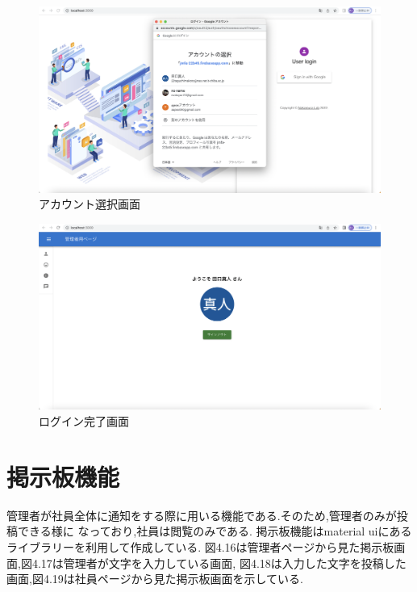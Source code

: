 \begin{figure}[!h]
  \begin{center}
    \includegraphics[scale=0.3, clip]{./img/sample14.png}
    \caption{アカウント選択画面}
    \label{fig:図の名前}
  \end{center}
  \end{figure}

  \begin{figure}[!h]
    \begin{center}
      \includegraphics[scale=0.3, clip]{./img/sample15.png}
      \caption{ログイン完了画面}
      \label{fig:図の名前}
    \end{center}
    \end{figure}

    \clearpage

\section{掲示板機能}
管理者が社員全体に通知をする際に用いる機能である.そのため,管理者のみが投稿できる様に
なっており,社員は閲覧のみである.
掲示板機能はmaterial uiにあるライブラリーを利用して作成している.
図4.16は管理者ページから見た掲示板画面,図4.17は管理者が文字を入力している画面,
図4.18は入力した文字を投稿した画面,図4.19は社員ページから見た掲示板画面を示している.

